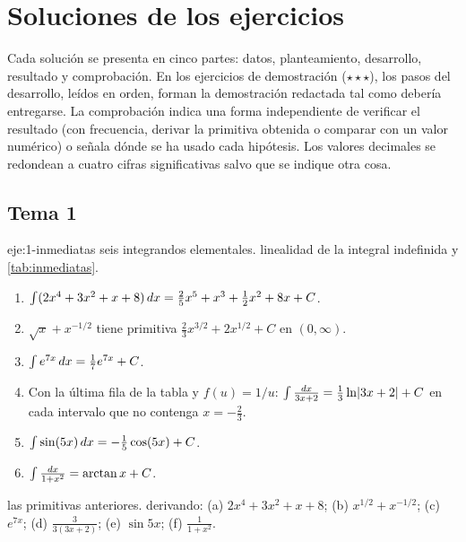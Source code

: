 \chapter{Soluciones de los ejercicios}
\label{ap:soluciones}

Cada solución se presenta en cinco partes: datos, planteamiento, desarrollo, resultado y comprobación. En los ejercicios de demostración ($\star\star\star$), los pasos del desarrollo, leídos en orden, forman la demostración redactada tal como debería entregarse. La comprobación indica una forma independiente de verificar el resultado (con frecuencia, derivar la primitiva obtenida o comparar con un valor numérico) o señala dónde se ha usado cada hipótesis. Los valores decimales se redondean a cuatro cifras significativas salvo que se indique otra cosa.

\section{Tema 1}

\begin{solucion}{eje:1-inmediatas}
\datos seis integrandos elementales.
\planteamiento linealidad de la integral indefinida y \cref{tab:inmediatas}.
\pasos
\begin{enumerate}[label=(\alph*)]
  \item $\int(2x^{4}+3x^{2}+x+8)\mathop{}\!d x=\frac25x^{5}+x^{3}+\frac12x^{2}+8x+C$.
  \item $\sqrt x+x^{-1/2}$ tiene primitiva $\frac23x^{3/2}+2x^{1/2}+C$ en $(0,\infty)$.
  \item $\int e^{7x}\mathop{}\!d x=\frac17e^{7x}+C$.
  \item Con la última fila de la tabla y $f(u)=1/u$: $\int\frac{\mathop{}\!d x}{3x+2}=\frac13\ln\lvert3x+2\rvert+C$ en cada intervalo que no contenga $x=-\frac23$.
  \item $\int\sin(5x)\mathop{}\!d x=-\frac15\cos(5x)+C$.
  \item $\int\frac{\mathop{}\!d x}{1+x^{2}}=\arctan x+C$.
\end{enumerate}
\resultado las primitivas anteriores.
\comprobacion derivando: (a) $2x^{4}+3x^{2}+x+8$; (b) $x^{1/2}+x^{-1/2}$; (c) $e^{7x}$; (d) $\frac{3}{3(3x+2)}$; (e) $\sin5x$; (f) $\frac{1}{1+x^{2}}$.
\end{solucion}

